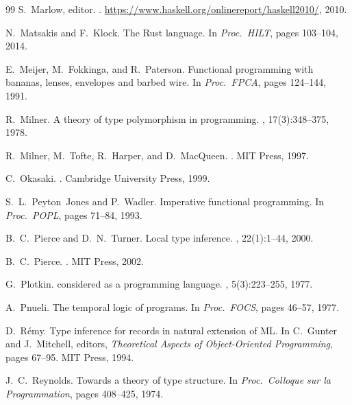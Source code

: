 \documentclass[11pt]{article}
\theoremstyle{definition}
\theoremstyle{remark}
\begin{document}
\begin{thebibliography}{99}
S.~Marlow, editor.
.
\newblock \url{https://www.haskell.org/onlinereport/haskell2010/}, 2010.

N.~Matsakis and F.~Klock.
\newblock The {Rust} language.
\newblock In {\em Proc.\ HILT}, pages 103--104, 2014.

E.~Meijer, M.~Fokkinga, and R.~Paterson.
\newblock Functional programming with bananas, lenses, envelopes and barbed
  wire.
\newblock In {\em Proc.\ FPCA}, pages 124--144, 1991.

R.~Milner.
\newblock A theory of type polymorphism in programming.
, 17(3):348--375, 1978.

R.~Milner, M.~Tofte, R.~Harper, and D.~MacQueen.
.
\newblock MIT Press, 1997.

C.~Okasaki.
.
\newblock Cambridge University Press, 1999.

S.~L.~Peyton~Jones and P.~Wadler.
\newblock Imperative functional programming.
\newblock In {\em Proc.\ POPL}, pages 71--84, 1993.

B.~C.~Pierce and D.~N.~Turner.
\newblock Local type inference.
,
  22(1):1--44, 2000.

B.~C.~Pierce.
.
\newblock MIT Press, 2002.

G.~Plotkin.
 considered as a programming language.
, 5(3):223--255, 1977.

A.~Pnueli.
\newblock The temporal logic of programs.
\newblock In {\em Proc.\ FOCS}, pages 46--57, 1977.

D.~R\'{e}my.
\newblock Type inference for records in natural extension of {ML}.
\newblock In C.~Gunter and J.~Mitchell, editors, {\em Theoretical Aspects of
  Object-Oriented Programming}, pages 67--95. MIT Press, 1994.

J.~C.~Reynolds.
\newblock Towards a theory of type structure.
\newblock In {\em Proc.\ Colloque sur la Programmation}, pages 408--425, 1974.


\end{thebibliography}
\end{document}
